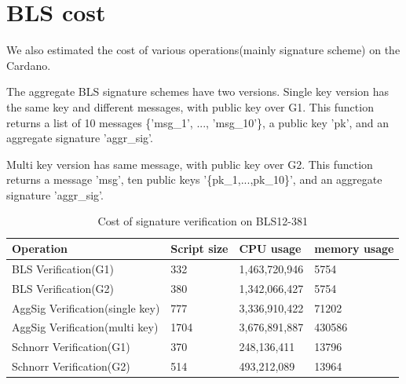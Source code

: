 \documentclass{article}
\begin{document}
\section{BLS cost}

We also estimated the cost of various operations(mainly signature scheme) on the Cardano.

The aggregate BLS signature schemes have two versions. Single key version has the same key and different messages, with public key over G1. This
function returns a list of 10 messages \{'msg\_1', ..., 'msg\_10'\}, a public key 'pk', and an aggregate signature 'aggr\_sig'.

Multi key version has same message, with public key over G2. This function returns a message 'msg', ten public keys '\{pk\_1,...,pk\_10\}', and an aggregate signature 'aggr\_sig'.


\begin{table}[H]
    \centering
    \begin{tabular}{p{5cm}|p{2cm}|p{3cm}|p{3cm}} \hline
         Operation& Script size & CPU usage& memory usage  \\ \hline
         BLS Verification(G1)& 332  &    1,463,720,946   &  5754 \\ \hline
         BLS Verification(G2)& 380  &    1,342,066,427   &  5754 \\ \hline
         AggSig Verification(single key) &  777  &     3,336,910,422 &        71202   \\ \hline
         AggSig Verification(multi key) & 1704  &    3,676,891,887          &430586   \\ \hline
         Schnorr Verification(G1)  & 370   &     248,136,411   &          13796 \\ \hline
         Schnorr Verification(G2)  & 514    &    493,212,089    &         13964 \\ \hline
    \end{tabular}
    \caption{Cost of signature verification on BLS12-381}
    \label{tab:my_label}
\end{table}
\end{document}
